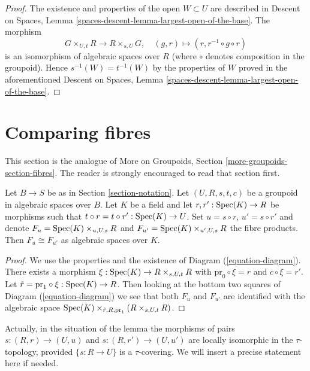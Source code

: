 \begin{proof}
The existence and properties of the open $W \subset U$ are described in
Descent on Spaces, Lemma \ref{spaces-descent-lemma-largest-open-of-the-base}.
The morphism
$$
G \times_{U, t} R \longrightarrow R \times_{s, U} G, \quad
(g, r) \longmapsto (r, r^{-1} \circ g \circ r)
$$
is an isomorphism of algebraic spaces over $R$ (where $\circ$ denotes
composition in the groupoid). Hence $s^{-1}(W) = t^{-1}(W)$ by the
properties of $W$ proved in the aforementioned
Descent on Spaces, Lemma \ref{spaces-descent-lemma-largest-open-of-the-base}.
\end{proof}




\section{Comparing fibres}
\label{section-fibres}

\noindent
This section is the analogue of
More on Groupoids, Section \ref{more-groupoids-section-fibres}.
The reader is strongly encouraged to read that section first.

\begin{lemma}
\label{lemma-two-fibres}
Let $B \to S$ be as in Section \ref{section-notation}.
Let $(U, R, s, t, c)$ be a groupoid in algebraic spaces over $B$.
Let $K$ be a field and let $r, r' : \mathop{\mathrm{Spec}}(K) \to R$
be morphisms such that $t \circ r = t \circ r' : \mathop{\mathrm{Spec}}(K) \to U$.
Set $u = s \circ r$, $u' = s \circ r'$ and denote
$F_u = \mathop{\mathrm{Spec}}(K) \times_{u, U, s} R$ and
$F_{u'} = \mathop{\mathrm{Spec}}(K) \times_{u', U, s} R$ the fibre products.
Then $F_u \cong F_{u'}$ as algebraic spaces over $K$.
\end{lemma}

\begin{proof}
We use the properties and the existence of
Diagram (\ref{equation-diagram}).
There exists a morphism $\xi : \mathop{\mathrm{Spec}}(K) \to R \times_{s, U, t} R$
with $\text{pr}_0 \circ \xi = r$ and $c \circ \xi = r'$.
Let $\tilde r = \text{pr}_1 \circ \xi : \mathop{\mathrm{Spec}}(K) \to R$.
Then looking at the bottom two squares of
Diagram (\ref{equation-diagram})
we see that both $F_u$ and $F_{u'}$ are identified with the algebraic space
$\mathop{\mathrm{Spec}}(K) \times_{\tilde r, R, \text{pr}_1} (R \times_{s, U, t} R)$.
\end{proof}

\noindent
Actually, in the situation of the lemma the morphisms of pairs
$s : (R, r) \to (U, u)$ and $s : (R, r') \to (U, u')$ are
locally isomorphic in the $\tau$-topology, provided $\{s: R \to U\}$ is a
$\tau$-covering. We will insert a precise statement here if needed.








